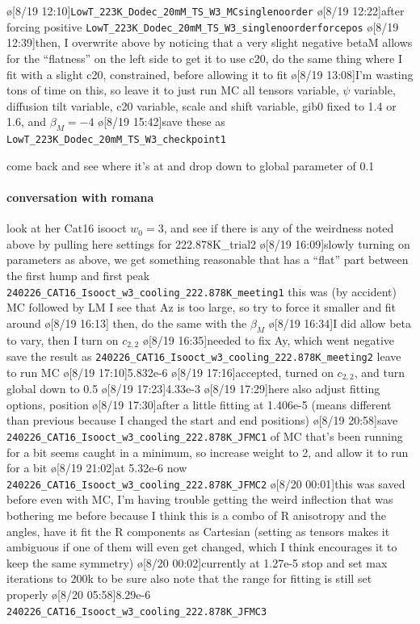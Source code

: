 \begin{err}
\begin{err}
        \o[8/19 12:10]{\texttt{LowT_223K_Dodec_20mM_TS_W3_MCsinglenoorder}}
        \o[8/19 12:22]{after forcing positive \texttt{LowT_223K_Dodec_20mM_TS_W3_singlenoorderforcepos}}
        \o[8/19 12:39]{then, I overwrite above by noticing that a very slight negative betaM allows for the ``flatness'' on the left side}
        to get it to use c20, do the same thing where I fit with a slight c20, constrained, before allowing it to fit
        \o[8/19 13:08]{I'm wasting tons of time on this, so}
        leave it to just run MC
        all tensors variable, $\psi$ variable, diffusion tilt variable,
        c20 variable, scale and shift variable,
        gib0 fixed to 1.4 or 1.6, and $\beta_M=-4$
        \o[8/19 15:42]{save these as \texttt{LowT_223K_Dodec_20mM_TS_W3_checkpoint1}}

    \end{err}
    come back and see where it's at and
    drop down to global parameter of 0.1

\end{err}
\paragraph{conversation with romana}
look at her Cat16 isooct $w_0=3$, and see if there is any of the weirdness noted above by pulling here settings for 222.878K\_trial2
\o[8/19 16:09]{slowly turning on parameters as above, we get something reasonable that has a ``flat'' part between the first hump and first peak
\texttt{240226_CAT16_Isooct_w3_cooling_222.878K_meeting1}
this was (by accident) MC followed by LM}
I see that Az is too large, so try to force it smaller and fit around
\o[8/19 16:13]{}
then, do the same with the $\beta_M$
\o[8/19 16:34]{I did allow beta to vary, then I turn on $c_{2,2}$}
\o[8/19 16:35]{needed to fix Ay, which went negative}
save the result as \texttt{240226_CAT16_Isooct_w3_cooling_222.878K_meeting2}
leave to run MC
\o[8/19 17:10]{5.832e-6}
\o[8/19 17:16]{accepted, turned on $c_{2,2}$, and turn global down to 0.5}
\o[8/19 17:23]{4.33e-3}
\o[8/19 17:29]{here also adjust fitting options, position}
\o[8/19 17:30]{after a little fitting at 1.406e-5 (means different than previous because I changed the start and end positions)}
\o[8/19 20:58]{save \texttt{240226_CAT16_Isooct_w3_cooling_222.878K_JFMC1} of MC that's been running for a bit}
seems caught in a minimum, so increase weight to 2, and allow it to run for a bit
\o[8/19 21:02]{at 5.32e-6 now}
\texttt{240226_CAT16_Isooct_w3_cooling_222.878K_JFMC2}
\o[8/20 00:01]{this was saved before}
even with MC, I'm having trouble getting the weird inflection that was bothering me before
because I think this is a combo of R anisotropy and the angles, have it fit the R components as Cartesian (setting as tensors makes it ambiguous if one of them will even get changed, which I think encourages it to keep the same symmetry)
\o[8/20 00:02]{currently at 1.27e-5}
stop and set max iterations to 200k to be sure
also note that the range for fitting is still set properly
\o[8/20 05:58]{8.29e-6 \texttt{240226_CAT16_Isooct_w3_cooling_222.878K_JFMC3}}

